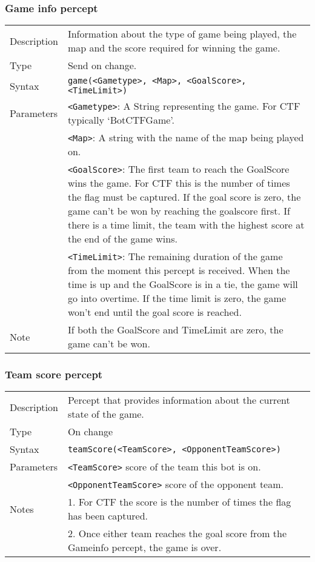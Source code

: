 \documentclass[11pt,a4paper]{article}
\begin{document}
\subsubsection*{Game info percept}
\begin{small}
\begin{tabular}{p{2cm}p{9cm}}
Description & Information about the type of game being played, the map and the score required for winning the game.\\
Type & Send on change.\\
Syntax & \verb|game(<Gametype>, <Map>, <GoalScore>,<TimeLimit>)|\\
Parameters &
	\verb|<Gametype>|: A String representing the game. For CTF typically `BotCTFGame'.\\
&	\verb|<Map>|: A string with the name of the map being played on. \\
&	\verb|<GoalScore>|: The first team to reach the GoalScore wins the game. For CTF this is the number of times the flag must be captured.  If the goal score is zero, the game can't be won by reaching the goalscore first. If there is a time limit, the team with the highest score at the end of the game wins.\\
&	\verb|<TimeLimit>|: The remaining duration of the game from the moment this percept is received. When the time is up and the GoalScore is in a tie, the game will go into overtime. If the time limit is zero, the game won't end until the goal score is reached.\\
Note & If both the GoalScore and TimeLimit are zero, the game can't be won.
\end{tabular}
\end{small}


\subsubsection*{Team score percept}
\begin{small}
\begin{tabular}{p{2cm}p{9cm}}
Description & Percept that provides information about the current state of the game.\\
Type & On change\\
Syntax & \verb|teamScore(<TeamScore>, <OpponentTeamScore>)|\\
Parameters &
\verb|<TeamScore>| score of the team this bot is on.\\
& \verb|<OpponentTeamScore>| score of the opponent team.\\
Notes &
	1.	For CTF the score is the number of times the flag has been captured.\\
&	2.	Once either team reaches the goal score from the Gameinfo percept, the game is over. 
\end{tabular}
\end{small}
\end{document}
